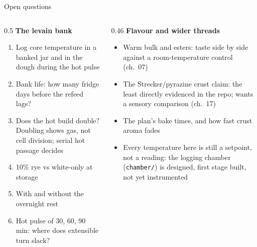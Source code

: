 \documentclass[aspectratio=169,11pt]{beamer}
\begin{document}
\begin{frame}{Open questions}
  \begin{columns}[T,onlytextwidth]
    \begin{column}{0.5\textwidth}
      \textbf{The levain bank} \untested
      \begin{enumerate}\footnotesize
        \item Log core temperature in a banked jar and in the dough during the hot pulse
        \item Bank life: how many fridge days before the refeed lags?
        \item Does the hot build double? Doubling shows gas, not cell division; serial hot passage decides
        \item 10\% rye vs white-only at storage
        \item With and without the overnight rest
        \item Hot pulse of 30, 60, 90 min: where does extensible turn slack?
      \end{enumerate}
    \end{column}
    \begin{column}{0.46\textwidth}
      \textbf{Flavour and wider threads}
      \begin{itemize}\footnotesize
        \item Warm bulk and esters: taste side by side against a room-temperature control (ch.~07) \contested
        \item The Strecker/pyrazine crust claim: the least directly evidenced in the repo; wants a sensory comparison (ch.~17)
        \item The plan's bake times, and how fast crust aroma fades \untested
        \item Every temperature here is still a setpoint, not a reading: the logging chamber (\texttt{chamber/}) is designed, first stage built, not yet instrumented
      \end{itemize}
    \end{column}
  \end{columns}
\end{frame}
\end{document}
